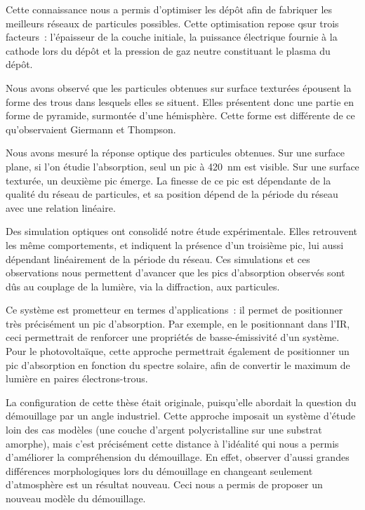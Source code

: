 Cette connaissance nous a permis d'optimiser les dépôt afin de fabriquer les meilleurs réseaux de particules possibles. Cette optimisation repose qsur trois facteurs~: l'épaisseur de la couche initiale, la puissance électrique fournie à la cathode lors du dépôt et la pression de gaz neutre constituant le plasma du dépôt.\par
Nous avons observé que les particules obtenues sur surface texturées épousent la forme des trous dans lesquels elles se situent. Elles présentent donc une partie en forme de pyramide, surmontée d'une hémisphère. Cette forme est différente de ce qu'observaient Giermann et Thompson.\par 
Nous avons mesuré la réponse optique des particules obtenues. Sur une surface plane, si l'on étudie l'absorption, seul un pic à 420~nm est visible. Sur une surface texturée, un deuxième pic émerge. La finesse de ce pic est dépendante de la qualité du réseau de particules, et sa position dépend de la période du réseau avec une relation linéaire. \par 
Des simulation optiques ont consolidé notre étude expérimentale. Elles retrouvent les même comportements, et indiquent la présence d'un troisième pic, lui aussi dépendant linéairement de la période du réseau. Ces simulations et ces observations nous permettent d'avancer que les pics d'absorption observés sont dûs au couplage de la lumière, via la diffraction, aux particules.\par 
Ce système est prometteur en termes d'applications~: il permet de positionner très précisément un pic d'absorption. Par exemple, en le positionnant dans l'IR, ceci permettrait de renforcer une propriétés de basse-émissivité d'un système. Pour le photovoltaïque, cette approche permettrait également de positionner un pic d'absorption en fonction du spectre solaire, afin de convertir le maximum de lumière en paires électrons-trous.\par 
\vspace{12pt}
La configuration de cette thèse était originale, puisqu'elle abordait la question du démouillage par un angle industriel. Cette approche imposait un système d'étude loin des cas modèles (une couche d'argent polycristalline sur une substrat amorphe), mais c'est précisément cette distance à l'idéalité qui nous a permis d'améliorer la compréhension du démouillage. En effet, observer d'aussi grandes différences morphologiques lors du démouillage en changeant seulement d'atmosphère est un résultat nouveau. Ceci nous a permis de proposer un nouveau modèle du démouillage.\par 

